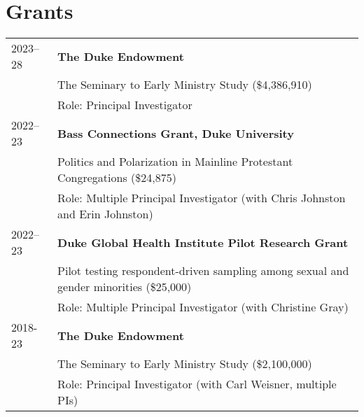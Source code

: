 
\section*{Grants}
\begin{longtable}{p{} p{}}
	
2023--28 & \textbf{The Duke Endowment}\\
& The Seminary to Early Ministry Study (\$4,386,910)\\
& Role: Principal Investigator\\

2022--23 & \textbf{Bass Connections Grant, Duke University}\\
& Politics and Polarization in Mainline Protestant Congregations (\$24,875)\\
& Role: Multiple Principal Investigator (with Chris Johnston and Erin Johnston)\\

2022--23 & \textbf{Duke Global Health Institute Pilot Research Grant}\\
& Pilot testing respondent-driven sampling among sexual and gender minorities (\$25,000)\\
& Role: Multiple Principal Investigator (with Christine Gray)\\

2018-23 & \textbf{The Duke Endowment}\\
& The Seminary to Early Ministry Study (\$2,100,000)\\
& Role: Principal Investigator (with Carl Weisner, multiple PIs)\\
%



\end{longtable}
